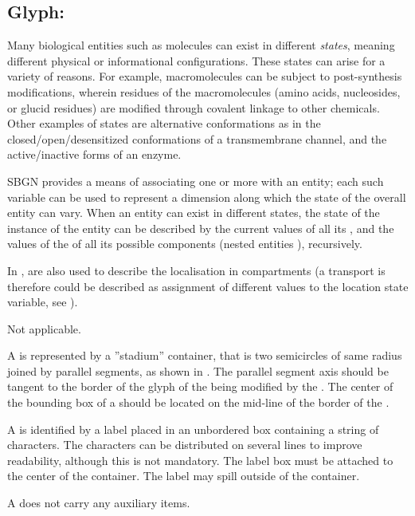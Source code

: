
\subsection{Glyph: }
\label{sec:stateVariable}

Many biological entities such as molecules can exist in different \emph{states}, meaning different physical or informational configurations.  These states can arise for a variety of reasons.  For example, macromolecules can be subject to post-synthesis modifications, wherein residues of the macromolecules (amino acids, nucleosides, or glucid residues) are modified through covalent linkage to other chemicals.  Other examples of states are alternative conformations as in the closed/open/desensitized conformations of a transmembrane channel, and the active/inactive forms of an enzyme.

SBGN provides a means of associating one or more  with an entity; each such variable can be used to represent a dimension along which the state of the overall entity can vary.  When an entity can exist in different states, the state of the instance of the entity %
can be described by the current values of all its , and the values of the  of all its possible components (nested entities ), recursively.

In \SBGNERLone,  are also used to describe the localisation in compartments (a transport is therefore could be described as assignment of different values to the location state variable, see ).

\begin{glyphDescription}

\glyphSboTerm Not applicable.

\glyphContainer A  is represented by a ''stadium'' container, that is two semicircles of same radius joined by parallel segments, as shown in .  The parallel segment axis should be tangent to the border of the glyph of the  being modified by the . The center of the bounding box of a  should be located on the mid-line of the border of the .

\glyphLabel A  is identified by a label placed in an unbordered box containing a string of characters.  The characters can be distributed on several lines to improve readability, although this is not mandatory.  The label box must be attached to the center of the container.  The label may spill outside of the container.

\glyphAux A  does not carry any auxiliary items.  

\end{glyphDescription}

